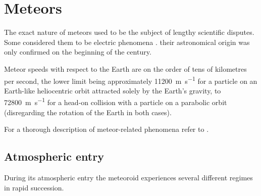 
\section{Meteors} \label{il}
    The exact nature of meteors used to be the subject of lengthy scientific disputes.
    Some considered them to be electric phenomena \citep{???}.
    their astronomical origin was only confirmed on the beginning of the  century.

    Meteor speeds with respect to the Earth are on the order of tens of kilometres per second,
    the lower limit being approximately \SI{11200}{\metre\per\second} for a particle on an Earth-like
    heliocentric orbit attracted solely by the Earth's gravity, to \SI{72800}{\metre\per\second}
    for a head-on collision with a particle on a parabolic orbit (disregarding the rotation of the Earth in both cases).

    For a thorough description of meteor-related phenomena refer to \citep{ceplecha+1998}.

    \subsection{Atmospheric entry} \label{ile}
        During its atmospheric entry the meteoroid experiences several different regimes in rapid succession.

